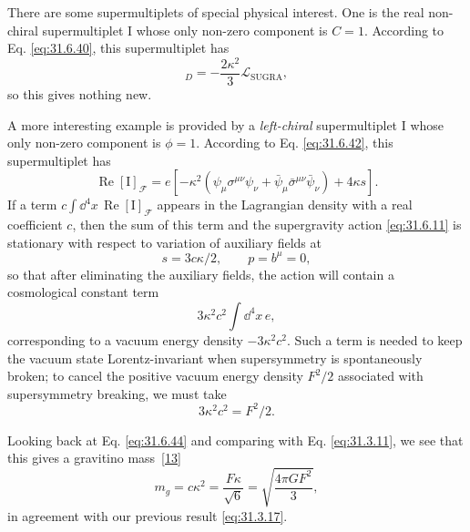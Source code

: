 There are some supermultiplets of special physical interest. One is the
real non-chiral supermultiplet \(\mathrm I\) whose only non-zero
component is \(C=1\). According to Eq. \eqref{eq:31.6.40}, this
supermultiplet has
\begin{equation}
  [\mathrm I]_D=-\frac{2\kappa^2}{3}\mathcal L_{\mathrm{SUGRA}},
  \tag{31.6.43}\label{eq:31.6.43}
\end{equation}
so this gives nothing new.

A more interesting example is provided by a \emph{left-chiral}
supermultiplet \(\mathrm I\) whose only non-zero component is \(\phi=1\).
According to Eq. \eqref{eq:31.6.42}, this supermultiplet has
\begin{equation}
  \operatorname{Re}[\mathrm I]_{\mathcal F}
  =e\left[
    -\kappa^2\left(
      \psi_\mu\sigma^{\mu\nu}\psi_\nu
      +\bar\psi_\mu\bar\sigma^{\mu\nu}\bar\psi_\nu\right)
    +4\kappa s
  \right].
  \tag{31.6.44}\label{eq:31.6.44}
\end{equation}
If a term \(c\int \dd^4x\,\operatorname{Re}[\mathrm I]_{\mathcal F}\)
appears in the Lagrangian density with a real coefficient \(c\), then
the sum of this term and the supergravity action \eqref{eq:31.6.11} is
stationary with respect to variation of auxiliary fields at
\begin{equation}
  s=3c\kappa/2,\qquad p=b^\mu=0,
  \tag{31.6.45}\label{eq:31.6.45}
\end{equation}
so that after eliminating the auxiliary fields, the action will contain
a cosmological constant term
\begin{equation}
  3\kappa^2c^2\int \dd^4x\,e,
  \tag{31.6.46}\label{eq:31.6.46}
\end{equation}
corresponding to a vacuum energy density \(-3\kappa^2c^2\). Such a term
is needed to keep the vacuum state Lorentz-invariant when supersymmetry
is spontaneously broken; to cancel the positive vacuum energy density
\(F^2/2\) associated with supersymmetry breaking, we must take
\begin{equation}
  3\kappa^2c^2=F^2/2.
  \tag{31.6.47}\label{eq:31.6.47}
\end{equation}

Looking back at Eq. \eqref{eq:31.6.44} and comparing with
Eq. \eqref{eq:31.3.11}, we see that this gives a gravitino
mass~\hyperref[ch31-ref-13]{[13]}
\begin{equation}
  m_g=c\kappa^2
  =\frac{F\kappa}{\sqrt{6}}
  =\sqrt{\frac{4\pi G F^2}{3}},
  \tag{31.6.48}\label{eq:31.6.48}
\end{equation}
in agreement with our previous result \eqref{eq:31.3.17}.

